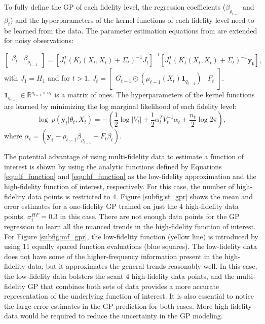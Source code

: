 To fully define the GP of each fidelity level, the regression coefficients ($\beta_{\rho_{t-1}}$ and $\beta_t$) and the hyperparameters of the kernel functions of each fidelity level need to be learned from the data.
The parameter estimation equations from  \cite{gratiet_multi-fidelity_nodate} are extended for noisy observations:

\begin{equation} \label{equ:param_est_mf}
    \begin{bmatrix}
    \beta_t & \beta_{\rho_{t-1}}
    \end{bmatrix} = \left [ J_t^T \left ( K_t(X_t,X_t) + \Sigma_t \right )^{-1} J_t \right ]^{-1} \left [ J_t^T \left ( K_t(X_t,X_t) + \Sigma_t \right ) ^{-1} \mathbf{y_t} \right ], 
\end{equation}
with $J_1 = H_1$ and for $t > 1$, $J_t =  \begin{bmatrix} G_{t-1} \odot \left ( \mu_{t-1} \left ( X_t \right )  \mathbf{1}_{q_{t-1}} \right ) & F_t \end{bmatrix}$.
$\mathbf{1}_{q_{t-1}} \in \mathbb{R} ^{q_{t-1} \times n_t} $ is a matrix of ones.
The hyperparameters of the kernel functions are learned by minimizing the log marginal likelihood of each fidelity level:
\begin{equation} \label{equ:hyp_param_mf}
    \log~p(\mathbf{y}_t|\theta_t,X_t) = -\left (\frac{1}{2} \log|V_t| + \frac{1}{2} \alpha_t^T V_t^{-1} \alpha_t + \frac{n_t}{2}\log 2\pi \right),
\end{equation}
where $\alpha_t = \left (\mathbf{y_t} - \rho_{t-1} \beta_{\rho_{t-1}}-F_t\beta_t \right )$.

The potential advantage of using multi-fidelity data to estimate a function of interest is shown by using the analytic functions defined by Equations \ref{equ:lf_function} and \ref{equ:hf_function} as the low-fidelity approximation and the high-fidelity function of interest, respectively. 
For this case, the number of high-fidelity data points is restricted to $4$. 
Figure \ref{subfig:sf_gpr} shows the mean and error estimates for a one-fidelity GP trained on just the $4$ high-fidelity data points. 
$\sigma_i^{HF} = 0.3$ in this case.
There are not enough data points for the GP regression to learn all the nuanced trends in the high-fidelity function of interest. 
For Figure \ref{subfig:mf_gpr}, the low-fidelity function (yellow line) is introduced by using 11 equally spaced function evaluations (blue squares). 
The low-fidelity data does not have some of the higher-frequency information present in the high-fidelity data, but it approximates the general trends reasonably well. 
In this case, the low-fidelity data bolsters the scant $4$ high-fidelity data points, and the multi-fidelity GP that combines both sets of data provides a more accurate representation of the underlying function of interest. 
It is also essential to notice the large error estimates in the GP prediction for both cases. 
More high-fidelity data would be required to reduce the uncertainty in the GP modeling. 

